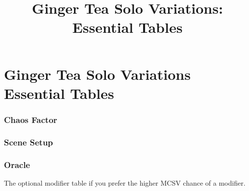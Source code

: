 

\title{Ginger Tea Solo Variations: Essential Tables}


\mainmatter
\chapter*{Ginger Tea Solo Variations\hspace*{8cm} Essential Tables \version}
\subsection{Chaos Factor}

\subsection{Scene Setup}


\newpage
\subsection{Oracle}


The optional modifier table if you prefer the higher MCSV chance of a modifier.


